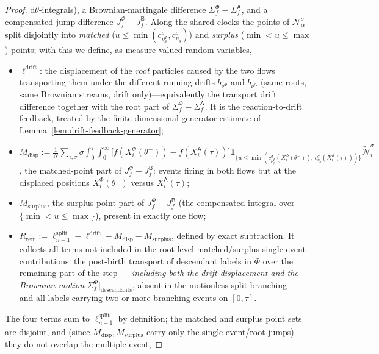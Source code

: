 \documentclass[a4paper,fleqn]{cas-sc}
\theoremstyle{definition}
\theoremstyle{remark}
\begin{document}
\begin{proof}
$\mathrm d\theta$-integrals), a Brownian-martingale difference
$\Sigma^\Phi_f-\Sigma^{\mathsf A}_f$, and a compensated-jump difference
$J^\Phi_f-J^{\mathsf B}_f$. Along the shared clocks the points of $\mathcal N^\sigma_\alpha$
split disjointly into \emph{matched}
($u\le\min(c^\sigma_{\nu^\Phi_\theta},c^\sigma_{\eta_\theta})$) and \emph{surplus}
($\min<u\le\max$) points; with this we define, as measure-valued random variables,
\begin{itemize}
\item $\ell^{\mathrm{drift}}$: the displacement of the \emph{root} particles caused
by the two flows transporting them under the different running drifts
$b_{\nu^\Phi}$ and $b_{\nu^{\mathsf A}}$ (same roots, same Brownian streams, drift
only)—equivalently the transport drift difference together with the root part of
$\Sigma^\Phi_f-\Sigma^{\mathsf A}_f$. It is the reaction-to-drift feedback, treated
by the finite-dimensional generator estimate of
Lemma~\ref{lem:drift-feedback-generator};
\item $M_{\mathrm{disp}}:=\tfrac1N\sum_{i,\sigma}\sigma\!\int_0^\tau\!\!\int_0^\infty\!
\bigl[f(X^\Phi_i(\theta^-))-f(X^{\mathsf A}_i(\tau))\bigr]\mathbf 1_{\{u\le\min(c^\sigma_{\nu^\Phi_\theta}(X^\Phi_i(\theta^-)),\,c^\sigma_{\eta_\theta}(X^{\mathsf A}_i(\tau)))\}}\widetilde{\mathcal N}^\sigma_i$,
the matched-point part of $J^\Phi_f-J^{\mathsf B}_f$: events firing in both flows but
at the displaced positions $X^\Phi_i(\theta^-)$ versus $X^{\mathsf A}_i(\tau)$;
\item $M_{\mathrm{surplus}}$, the surplus-point part of $J^\Phi_f-J^{\mathsf B}_f$
(the compensated integral over $\{\min<u\le\max\}$), present in exactly one flow;
\item $R_{\mathrm{rem}}:=\ell^{\mathrm{split}}_{n+1}-\ell^{\mathrm{drift}}-M_{\mathrm{disp}}-M_{\mathrm{surplus}}$,
defined by exact subtraction. It collects all terms not included in the root-level
matched/surplus single-event contributions: the post-birth transport of descendant
labels in $\Phi$ over the remaining part of the step --- \emph{including both the drift
displacement and the Brownian motion} $\Sigma^\Phi_f|_{\text{descendants}}$, absent in
the motionless split branching --- and all labels carrying two or more branching events
on $[0,\tau]$.
\end{itemize}
The four terms sum to $\ell^{\mathrm{split}}_{n+1}$ by definition; the matched and
surplus point sets are disjoint, and (since $M_{\mathrm{disp}},M_{\mathrm{surplus}}$
carry only the single-event/root jumps) they do not overlap the multiple-event,

\end{proof}
\end{document}
